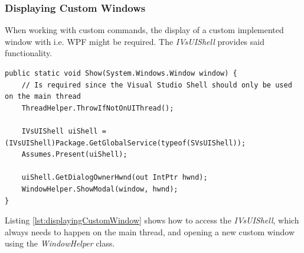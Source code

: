 \subsubsection{Displaying Custom Windows}
When working with custom commands, the display of a custom implemented window with i.e. WPF might be required.
The \textit{IVsUIShell} provides said functionality.
\begin{lstlisting}[style=CSharp, caption={Displaying a custom window}, label={lst:displayingCustomWindow}]
public static void Show(System.Windows.Window window) {
	// Is required since the Visual Studio Shell should only be used on the main thread
	ThreadHelper.ThrowIfNotOnUIThread();
	
	IVsUIShell uiShell = (IVsUIShell)Package.GetGlobalService(typeof(SVsUIShell));
	Assumes.Present(uiShell);
	
	uiShell.GetDialogOwnerHwnd(out IntPtr hwnd);
	WindowHelper.ShowModal(window, hwnd);
}
\end{lstlisting}
Listing \ref{lst:displayingCustomWindow} shows how to access the \textit{IVsUIShell}, which always needs to happen on the main thread, and opening a new custom window using the \textit{WindowHelper} class.

\newpage
